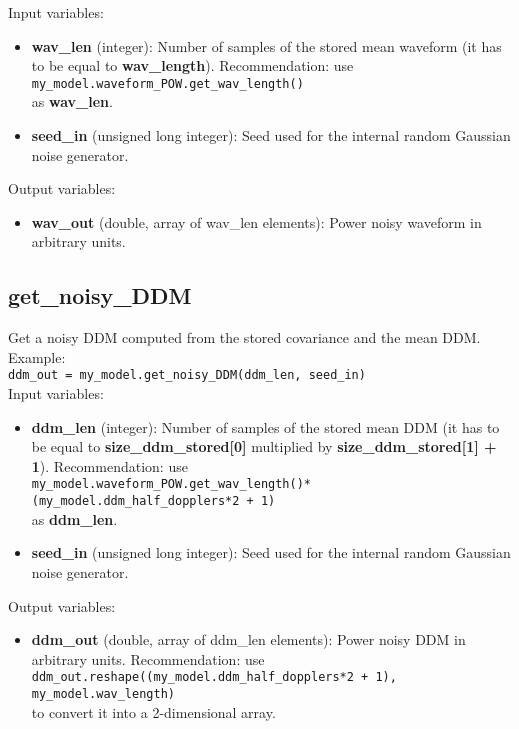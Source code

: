 Input variables:
\begin{itemize}
\item {\bf wav\_len} (integer): Number of samples of the stored mean waveform (it has to be equal to {\bf wav\_length}). Recommendation: use\\ \texttt{my\_model.waveform\_POW.get\_wav\_length()}\\ as {\bf wav\_len}.
\item {\bf seed\_in} (unsigned long integer): Seed used for the internal random Gaussian noise generator.
\end{itemize}

Output variables:
\begin{itemize}
\item {\bf wav\_out} (double, array of wav\_len elements): Power noisy waveform in arbitrary units.
\end{itemize}


\subsection{get\_noisy\_DDM}

Get a noisy DDM computed from the stored covariance and the mean DDM.\\

Example:\\

\texttt{ddm\_out = my\_model.get\_noisy\_DDM(ddm\_len, seed\_in)}\\

Input variables:
\begin{itemize}
\item {\bf ddm\_len} (integer): Number of samples of the stored mean DDM (it has to be equal to {\bf size\_ddm\_stored[0]} multiplied by {\bf size\_ddm\_stored[1] + 1}). Recommendation: use\\ \texttt{my\_model.waveform\_POW.get\_wav\_length()*(my\_model.ddm\_half\_dopplers*2 + 1)}\\ as {\bf ddm\_len}.
\item {\bf seed\_in} (unsigned long integer): Seed used for the internal random Gaussian noise generator.
\end{itemize}

Output variables:
\begin{itemize}
\item {\bf ddm\_out} (double, array of ddm\_len elements): Power noisy DDM in arbitrary units. Recommendation: use\\ \texttt{ddm\_out.reshape((my\_model.ddm\_half\_dopplers*2 + 1), my\_model.wav\_length)}\\ to convert it into a 2-dimensional array.
\end{itemize}


